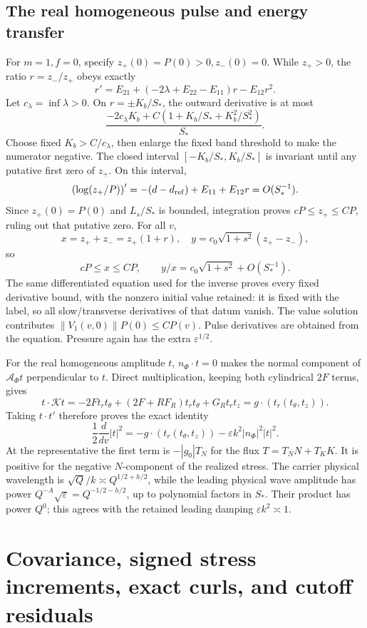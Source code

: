 \documentclass[10pt,a4paper]{article}
\begin{document}
\subsection{The real homogeneous pulse and energy transfer}\label{the-real-homogeneous-pulse-and-energy-transfer}

For \(m=1,f=0\), specify \(z_+(0)=P(0)>0,z_-(0)=0\). While \(z_+>0\), the ratio \(r=z_-/z_+\) obeys exactly \[
r'=E_{21}+(-2\lambda+E_{22}-E_{11})r-E_{12}r^2.
\] Let \(c_\lambda=\inf\lambda>0\). On \(r=\pm K_b/S_*\), the outward derivative is at most \[
\frac{-2c_\lambda K_b+C(1+K_b/S_*+K_b^2/S_*^2)}{S_*}.
\] Choose fixed \(K_b>C/c_\lambda\), then enlarge the fixed band threshold to make the numerator negative. The closed interval \([-K_b/S_*,K_b/S_*]\) is invariant until any putative first zero of \(z_+\). On this interval, \[
\left(\log(z_+/P)\right)'=-(d-d_{\rm ref})+E_{11}+E_{12}r=O(S_*^{-1}).
\] Since \(z_+(0)=P(0)\) and \(L_s/S_*\) is bounded, integration proves \(cP\le z_+\le CP\), ruling out that putative zero. For all \(v\), \[
x=z_++z_-=z_+(1+r),\quad
y=c_0\sqrt{1+s^2}(z_+-z_-),
\] so \[
cP\le x\le CP,\qquad
y/x=c_0\sqrt{1+s^2}+O(S_*^{-1}).
\] The same differentiated equation used for the inverse proves every fixed derivative bound, with the nonzero initial value retained: it is fixed with the label, so all slow/transverse derivatives of that datum vanish. The value solution contributes \(\|V_1(v,0)\|P(0)\le CP(v)\). Pulse derivatives are obtained from the equation. Pressure again has the extra \(\varepsilon^{1/2}\).

For the real homogeneous amplitude \(t\), \(n_\Phi\cdot t=0\) makes the normal component of \(\mathcal A_\Phi t\) perpendicular to \(t\). Direct multiplication, keeping both cylindrical \(2F\) terms, gives \[
t\cdot\mathcal Kt
=-2Ft_rt_\theta+(2F+RF_R)t_rt_\theta+G_Rt_rt_z
=g\cdot(t_r(t_\theta,t_z)).
\] Taking \(t\cdot t'\) therefore proves the exact identity \[
\frac12\frac{d}{dv}|t|^2
=-g\cdot(t_r(t_\theta,t_z))-\varepsilon k^2|n_\Phi|^2|t|^2.
\] At the representative the first term is \(-|g_0|T_N\) for the flux \(T=T_NN+T_KK\). It is positive for the negative \(N\)-component of the realized stress. The carrier physical wavelength is \(\sqrt Q/k\asymp Q^{1/2+h/2}\), while the leading physical wave amplitude has power \(Q^{-A}\sqrt\varepsilon=Q^{-1/2-h/2}\), up to polynomial factors in \(S_*\). Their product has power \(Q^0\); this agrees with the retained leading damping \(\varepsilon k^2\asymp1\).

\section{Covariance, signed stress increments, exact curls, and cutoff residuals}\label{covariance-signed-stress-increments-exact-curls-and-cutoff-residuals}
\end{document}
